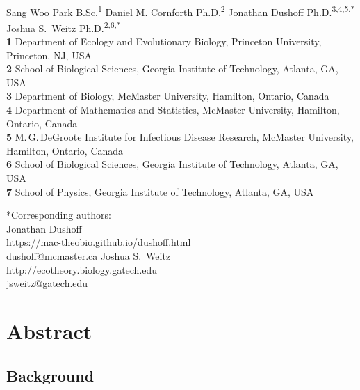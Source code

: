 \documentclass[12pt]{article}
\date{\today}
\begin{document}
\begin{flushleft}{
	\Large
	\textbf{}
}
\newline
\\
Sang Woo Park B.Sc.\textsuperscript{1}
Daniel M. Cornforth Ph.D.\textsuperscript{2}
Jonathan Dushoff Ph.D.\textsuperscript{3,4,5,*}
Joshua S.\ Weitz Ph.D.\textsuperscript{2,6,*}
\\
\bigskip
\textbf{1} Department of Ecology and Evolutionary Biology, Princeton University, Princeton, NJ, USA
\\
\textbf{2} School of Biological Sciences, Georgia Institute of Technology, Atlanta, GA, USA
\\
\textbf{3} Department of Biology, McMaster University, Hamilton, Ontario, Canada
\\
\textbf{4} Department of Mathematics and Statistics, McMaster University, Hamilton, Ontario, Canada
\\
\textbf{5} M.\,G.\,DeGroote Institute for Infectious Disease Research, McMaster University, Hamilton, Ontario, Canada
\\
\textbf{6} School of Biological Sciences, Georgia Institute of Technology, Atlanta, GA, USA
\\
\textbf{7} School of Physics, Georgia Institute of Technology, Atlanta, GA, USA
\\
\bigskip

*Corresponding authors:\\
Jonathan Dushoff\\
https://mac-theobio.github.io/dushoff.html\\
dushoff@mcmaster.ca
\newline\newline
Joshua S.\ Weitz\\
http://ecotheory.biology.gatech.edu\\
jsweitz@gatech.edu\\

\end{flushleft}

\pagebreak

\section*{Abstract}

\subsection*{Background}
\end{document}
